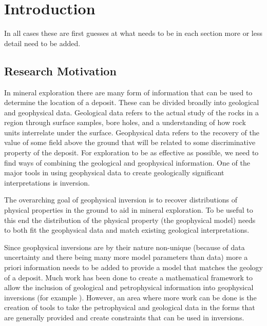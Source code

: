 
\chapter{Introduction}
\label{ch:Introduction}

\begin{epigraph}
\end{epigraph}

In all cases these are first guesses at what needs to be in each section more or less detail need to be added.

\section{Research Motivation}
\label{sec:Research Motivation}

In mineral exploration there are many form of information that can be used to determine the location of a deposit. These can be divided broadly into geological and geophysical data. Geological data refers to the actual study of the rocks in a region through surface samples, bore holes, and a understanding of how rock units interrelate under the surface. Geophysical data refers to the recovery of the value of some field above the ground that will be related to some discriminative property of the deposit. For exploration to be as effective as possible, we need to find ways of combining the geological and geophysical information. One of the major tools in using geophysical data to create geologically significant interpretations is inversion.

The overarching goal of geophysical inversion is to recover distributions of physical properties in the ground to aid in mineral exploration. To be useful to this end the distribution of the physical property (the geophysical model) needs to both fit the geophysical data and match existing geological interpretations. 

Since geophysical inversions are by their nature non-unique (because of data uncertainty and there being many more model parameters than data) more a priori information needs to be added to provide a model that matches the geology of a deposit. Much work has been done to create a mathematical framework to allow the inclusion of geological and petrophysical information into geophysical inversions (for example \cite{li19963}). However, an area where more work can be done is the creation of tools to take the petrophysical and geological data in the forms that are generally provided and create constraints that can be used in inversions.

